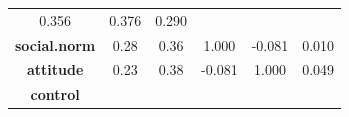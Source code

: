 \documentclass[]{article}
\theoremstyle{definition}
\theoremstyle{definition}
\theoremstyle{definition}
\theoremstyle{remark}
\begin{document}
\begin{longtable}[]{@{}cccccc@{}}
\begin{minipage}[t]{0.15\columnwidth}
0.356\strut
\end{minipage} & \begin{minipage}[t]{0.12\columnwidth}\centering\strut
0.376\strut
\end{minipage} & \begin{minipage}[t]{0.12\columnwidth}\centering\strut
0.290\strut
\end{minipage}\tabularnewline
\begin{minipage}[t]{0.19\columnwidth}\centering\strut
\textbf{social.norm}\strut
\end{minipage} & \begin{minipage}[t]{0.13\columnwidth}\centering\strut
0.28\strut
\end{minipage} & \begin{minipage}[t]{0.13\columnwidth}\centering\strut
0.36\strut
\end{minipage} & \begin{minipage}[t]{0.15\columnwidth}\centering\strut
1.000\strut
\end{minipage} & \begin{minipage}[t]{0.12\columnwidth}\centering\strut
-0.081\strut
\end{minipage} & \begin{minipage}[t]{0.12\columnwidth}\centering\strut
0.010\strut
\end{minipage}\tabularnewline
\begin{minipage}[t]{0.19\columnwidth}\centering\strut
\textbf{attitude}\strut
\end{minipage} & \begin{minipage}[t]{0.13\columnwidth}\centering\strut
0.23\strut
\end{minipage} & \begin{minipage}[t]{0.13\columnwidth}\centering\strut
0.38\strut
\end{minipage} & \begin{minipage}[t]{0.15\columnwidth}\centering\strut
-0.081\strut
\end{minipage} & \begin{minipage}[t]{0.12\columnwidth}\centering\strut
1.000\strut
\end{minipage} & \begin{minipage}[t]{0.12\columnwidth}\centering\strut
0.049\strut
\end{minipage}\tabularnewline
\begin{minipage}[t]{0.19\columnwidth}\centering\strut
\textbf{control}\strut
\end{minipage} & \begin{minipage}[t]{0.13\columnwidth}\centering\strut

\end{minipage}
\end{longtable}
\end{document}
